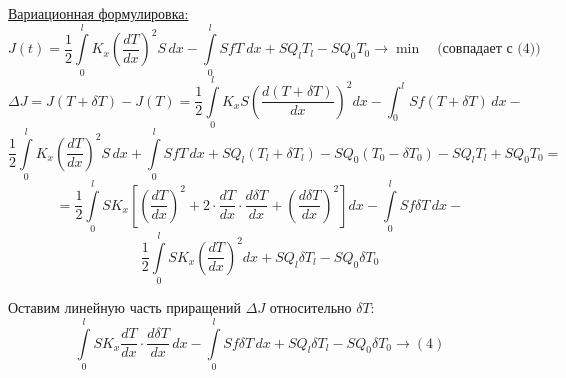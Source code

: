 	\underline{Вариационная формулировка:}
	\[
		J(t) = \frac{1}{2} \int\limits_0^{l} K_x \left( \frac{dT}{dx} \right)^2 S \, dx - \int\limits_0^{l} SfT \ dx + S Q_l T_l - S Q_0 T_0 \rightarrow \min \quad \text{(совпадает с (4))} 
	\]
	\[
		\Delta J = J(T + \delta T) - J(T) = \frac{1}{2} \int\limits_0^{l} K_x S \left( \frac{d(T + \delta T)}{dx} \right)^2 dx - \int_0^{l} S f (T + \delta T) \, dx -
	\]
	\[  
		 \frac{1}{2} \int\limits_0^{l} K_x \left( \frac{dT}{dx} \right)^2 S \, dx +
		 \int\limits_0^{l} S f T \, dx + S Q_l (T_l + \delta T_l) - S Q_0 (T_0 -\delta T_0) -
		 S Q_l T_l + S Q_0 T_0 =
	\] 
	\[
		= \frac{1}{2} \int\limits_0^{l} S K_x \left[ \left( \frac{dT}{dx} \right)^2 + 2 \cdot \frac{dT}{dx} \cdot \frac{d \delta T}{dx} + \left( \frac{d \delta T}{dx} \right)^2 \right] dx - \int\limits_0^{l} S f \delta T \, dx -
	\]
	\[ \frac{1}{2} \int\limits_0^{l} S K_x \left( \frac{dT}{dx} \right)^2 dx + S Q_l \delta T_l - S Q_0 \delta T_0 
	\]
	
	Оставим линейную часть приращений $\Delta J$ относительно $\delta T$:
	\[
		\int\limits_0^{l} S K_x \frac{dT}{dx}\cdot \frac{d \delta T}{dx} \, dx - \int\limits_0^{l} S f \delta T \, dx + S Q_l \delta T_l - S Q_0 \delta T_0 \rightarrow (4)
	\]